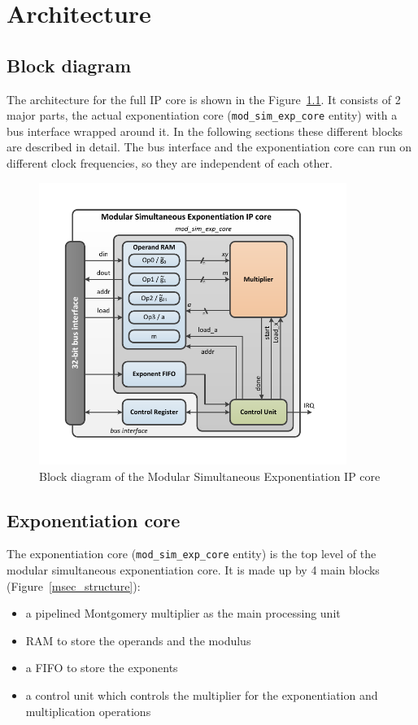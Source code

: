 \chapter{Architecture}

\section{Block diagram}
The architecture for the full IP core is shown in the Figure~\ref{blockdiagram}. It consists of 2 major parts, the actual
exponentiation core (\verb|mod_sim_exp_core| entity) with a bus interface wrapped around it. In the following sections these 
different blocks are described in detail. The bus interface and the exponentiation core can run on different clock
frequencies, so they are independent of each other.\\
\begin{figure}[H]
\centering
\includegraphics[trim=1.2cm 1.2cm 1.2cm 1.2cm, width=10cm]{pictures/block_diagram.pdf}
\caption{Block diagram of the Modular Simultaneous Exponentiation IP core}
\label{blockdiagram}
\end{figure}
\newpage

\section{Exponentiation core}
The exponentiation core (\verb|mod_sim_exp_core| entity) is the top level of the modular simultaneous exponentiation
core. It is made up by 4 main blocks (Figure~\ref{msec_structure}):\\

\begin{itemize}
	\item a pipelined Montgomery multiplier as the main processing unit
	\item RAM to store the operands and the modulus
	\item a FIFO to store the exponents
	\item a control unit which controls the multiplier for the exponentiation and multiplication operations
\end{itemize}

